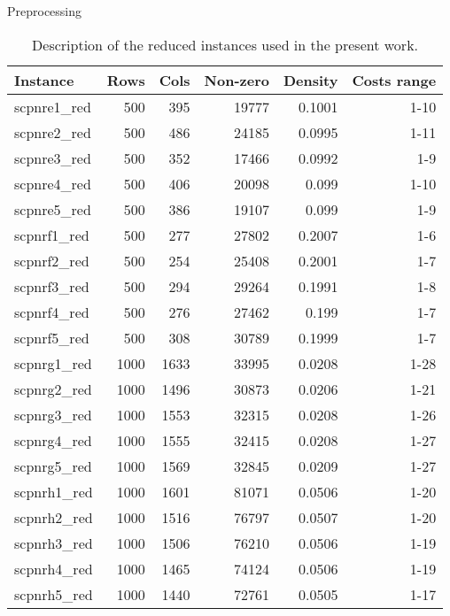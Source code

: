 \documentclass[a4paper,12pt]{mydeitesi_eng}
\begin{document}
\begin{chapter}{Preprocessing}
\begin{table}[H]
\begin{center}
\begin{tabular}{l|r|r|r|r|r}
\textbf{Instance} & \textbf{Rows} & \textbf{Cols} & \textbf{Non-zero} & \textbf{Density} & \textbf{Costs range}\\
\hline
scpnre1\_red & 500 & 395 & 19777 & 0.1001 & 1-10 \\
scpnre2\_red & 500 & 486 & 24185 & 0.0995 & 1-11 \\
scpnre3\_red & 500 & 352 & 17466 & 0.0992 & 1-9 \\
scpnre4\_red & 500 & 406 & 20098 & 0.099 & 1-10 \\
scpnre5\_red & 500 & 386 & 19107 & 0.099 & 1-9 \\
\hline
scpnrf1\_red & 500 & 277 & 27802 & 0.2007 & 1-6 \\
scpnrf2\_red & 500 & 254 & 25408 & 0.2001 & 1-7 \\
scpnrf3\_red & 500 & 294 & 29264 & 0.1991 & 1-8 \\
scpnrf4\_red & 500 & 276 & 27462 & 0.199 & 1-7 \\
scpnrf5\_red & 500 & 308 & 30789 & 0.1999 & 1-7 \\
\hline
scpnrg1\_red & 1000 & 1633 & 33995 & 0.0208 & 1-28 \\
scpnrg2\_red & 1000 & 1496 & 30873 & 0.0206 & 1-21 \\
scpnrg3\_red & 1000 & 1553 & 32315 & 0.0208 & 1-26 \\
scpnrg4\_red & 1000 & 1555 & 32415 & 0.0208 & 1-27 \\
scpnrg5\_red & 1000 & 1569 & 32845 & 0.0209 & 1-27 \\
\hline
scpnrh1\_red & 1000 & 1601 & 81071 & 0.0506 & 1-20 \\
scpnrh2\_red & 1000 & 1516 & 76797 & 0.0507 & 1-20 \\
scpnrh3\_red & 1000 & 1506 & 76210 & 0.0506 & 1-19 \\
scpnrh4\_red & 1000 & 1465 & 74124 & 0.0506 & 1-19 \\
scpnrh5\_red & 1000 & 1440 & 72761 & 0.0505 & 1-17 \\
\end{tabular}
\end{center}
\caption{Description of the reduced instances used in the present work.}
\label{tab:ReducedInstancesInfo}
\end{table}



\end{chapter}
\end{document}
